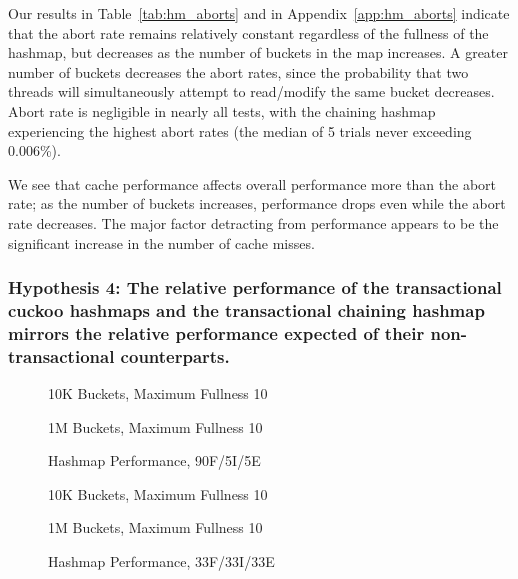 Our results in Table~\ref{tab:hm_aborts} and in Appendix~\ref{app:hm_aborts} indicate that the abort rate remains relatively constant regardless of the fullness of the hashmap, but decreases as the number of buckets in the map increases. A greater number of buckets decreases the abort rates, since the probability that two threads will simultaneously attempt to read/modify the same bucket decreases. Abort rate is negligible in nearly all tests, with the chaining hashmap experiencing the highest abort rates (the median of 5 trials never exceeding 0.006\%).

We see that cache performance affects overall performance more than the abort rate; as the number of buckets increases, performance drops even while the abort rate decreases. The major factor detracting from performance appears to be the significant increase in the number of cache misses.

\subsubsection{Hypothesis 4: The relative performance of the transactional cuckoo hashmaps and the transactional chaining hashmap mirrors the relative performance expected of their non-transactional counterparts.}

\begin{figure}[H]
    \centering
    \begin{minipage}{0.75\textwidth}
        \caption*{10K Buckets, Maximum Fullness 10}
        \vspace{12pt}
    \end{minipage}
    \begin{minipage}{0.75\textwidth}
        \caption*{1M Buckets, Maximum Fullness 10}
    \end{minipage}
	\caption{Hashmap Performance, 90F/5I/5E}
	\label{fig:hm_90}
\end{figure}

\begin{figure}[H]
    \centering
    \begin{minipage}{0.75\textwidth}
        \caption*{10K Buckets, Maximum Fullness 10}
        \vspace{12pt}
    \end{minipage}
    \begin{minipage}{0.75\textwidth}
        \caption*{1M Buckets, Maximum Fullness 10}
    \end{minipage}
	\caption{Hashmap Performance, 33F/33I/33E}
	\label{fig:hm_33}
\end{figure}

